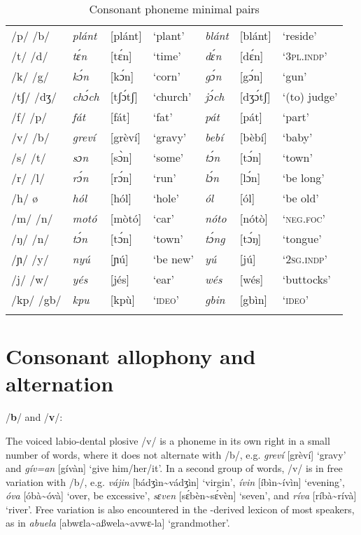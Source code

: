 \begin{table}
\caption{Consonant phoneme minimal pairs}
\label{tab:key:2.2}

\begin{tabularx}{\textwidth}{Qlll@{\qquad\qquad} lll}
\lsptoprule
/p/  /b/ & \itshape plánt & [plánt] & ‘plant’ & \itshape blánt & [blánt] & ‘reside’\\
/t/  /d/ & \itshape tɛ́n & [tɛ́n] & ‘time’ & \itshape dɛ́n & [dɛ́n] & ‘\textsc{3pl.indp}’\\
/k/  /g/ & \itshape kɔ́n & [kɔ́n] & ‘corn’ & \itshape gɔ́n & [gɔ́n] & ‘gun’\\
/tʃ/  /dʒ/ & \itshape chɔ́ch & [tʃɔ́tʃ] & ‘church’ & \itshape jɔ́ch & [dʒɔ́tʃ] & ‘(to) judge’\\
/f/  /p/ & \itshape fát & [fát] & ‘fat’ & \itshape pát & [pát] & ‘part’\\
/v/  /b/ & \itshape greví & [grèví] & ‘gravy’ & \itshape bebí & [bèbí] & ‘baby’\\
/s/  /t/ & \itshape sɔn & [sɔ̀n] & ‘some’ & \itshape tɔ́n & [tɔ́n] & ‘town’\\
/r/  /l/ & \itshape rɔ́n & [rɔ́n] & ‘run’ & \itshape lɔ́n & [lɔ́n] & ‘be long’\\
/h/  ø & \itshape hól & [hól] & ‘hole’ & \itshape ól & [ól] & ‘be old’\\
/m/  /n/ & \itshape motó & [mòtó] & ‘car’ & \itshape nóto & [nótò] & ‘\textsc{neg}.\textsc{foc}’\\
/ŋ/  /n/ & \itshape tɔ́n & [tɔ́n] & ‘town’ & \itshape tɔ́ng & [tɔ́ŋ] & ‘tongue’\\
/ɲ/  /y/ & \itshape nyú & [ɲú] & ‘be new’ & \itshape yú & [jú] & ‘\textsc{2sg.indp}’\\
/j/  /w/ & \itshape yés & [jés] & ‘ear’ & \itshape wés & [wés] & ‘buttocks’\\
/kp/ /gb/ & \itshape kpu & [kpù] & ‘\textsc{ideo}’ & \itshape gbin & [gbìn] & ‘\textsc{ideo}’\\
\lspbottomrule
\end{tabularx}
\end{table}
\section{Consonant allophony and alternation}\label{sec:2.2}

/\textbf{b}/ and /\textbf{v}/:

The voiced labio-dental plosive /v/ is a phoneme in its own right in a small number of words, where it does not alternate with /b/, e.g. \textit{greví} [grèví] ‘gravy’ and \textit{gív=an} [gívàn] ‘give him/her/it’. In a second group of words, /v/ is in free variation with /b/, e.g. \textit{vájin} [bádʒìn{\textasciitilde}vádʒìn] ‘virgin’, \textit{ívin} [íbìn{\textasciitilde}ívìn] ‘evening’, \textit{óva} [óbà{\textasciitilde}óvà] ‘over, be excessive’, \textit{sɛven} [sɛ́bèn{\textasciitilde}sɛ́vèn] ‘seven’, and \textit{ríva} [ríbà{\textasciitilde}rívà] ‘river’. Free variation is also encountered in the -derived lexicon of most speakers, as in \textit{abuela} [abwɛla{\textasciitilde}aßwela{\textasciitilde}avwɛ-la] ‘grandmother’. 



